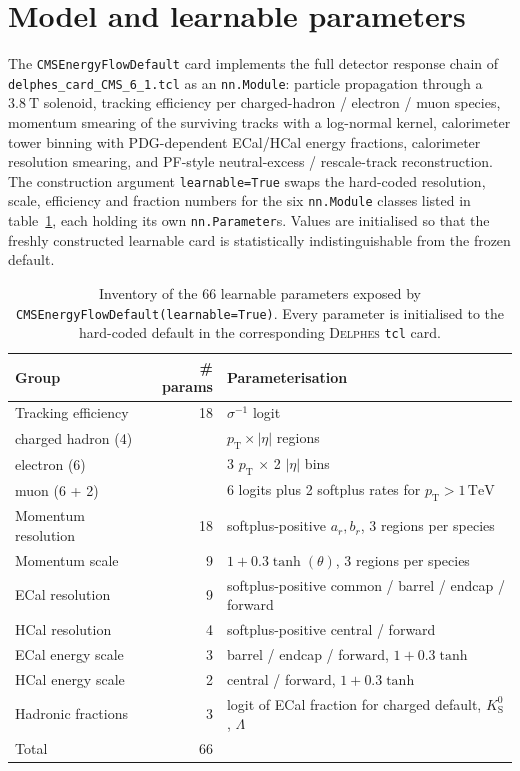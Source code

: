 \documentclass[a4paper,11pt]{article}
\begin{document}
\section{Model and learnable parameters}
\label{sec:model}

The \texttt{CMSEnergyFlowDefault} card implements the full detector
response chain of \texttt{delphes\_card\_CMS\_6\_1.tcl} as an
\texttt{nn.Module}: particle propagation through a $\SI{3.8}{\tesla}$
solenoid, tracking efficiency per charged-hadron / electron / muon
species, momentum smearing of the surviving tracks with a log-normal
kernel, calorimeter tower binning with PDG-dependent ECal/HCal energy
fractions, calorimeter resolution smearing, and PF-style
neutral-excess / rescale-track reconstruction. The construction
argument \texttt{learnable=True} swaps the hard-coded resolution,
scale, efficiency and fraction numbers for the six \texttt{nn.Module}
classes listed in table~\ref{tab:params}, each holding its own
\texttt{nn.Parameter}s. Values are initialised so that the freshly
constructed learnable card is statistically indistinguishable from the
frozen default.

\begin{table}[tbp]
\centering
\caption{Inventory of the 66 learnable parameters exposed by
\texttt{CMSEnergyFlowDefault(learnable=True)}. Every parameter is
initialised to the hard-coded default in the corresponding
\textsc{Delphes} \texttt{tcl} card.}
\label{tab:params}
\small
\begin{tabular}{lrl}
\toprule
Group & \# params & Parameterisation \\
\midrule
Tracking efficiency        & 18 & $\sigma^{-1}$ logit \\
\quad charged hadron (4)   &    & $p_\mathrm{T}\times|\eta|$ regions \\
\quad electron (6)         &    & 3 $p_\mathrm{T}$ $\times$ 2 $|\eta|$ bins \\
\quad muon (6 + 2)         &    & 6 logits plus 2 softplus rates for $p_\mathrm{T}>1\,\mathrm{TeV}$ \\
Momentum resolution        & 18 & softplus-positive $a_r, b_r$, 3 regions per species \\
Momentum scale             &  9 & $1+0.3\tanh(\theta)$, 3 regions per species \\
ECal resolution            &  9 & softplus-positive common / barrel / endcap / forward \\
HCal resolution            &  4 & softplus-positive central / forward \\
ECal energy scale          &  3 & barrel / endcap / forward, $1+0.3\tanh$ \\
HCal energy scale          &  2 & central / forward, $1+0.3\tanh$ \\
Hadronic fractions         &  3 & logit of ECal fraction for charged default, $K^0_{\mathrm{S}}$, $\Lambda$ \\
\midrule
Total                      & 66 & \\
\bottomrule
\end{tabular}
\end{table}
\end{document}
